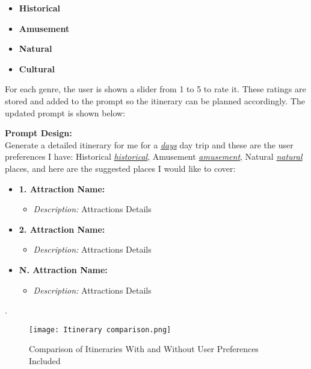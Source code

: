 \documentclass[sigconf,authordraft]{acmart}
\begin{document}
\begin{itemize}
  \item \textbf{Historical}
  \item \textbf{Amusement}
  \item \textbf{Natural}
  \item \textbf{Cultural}
\end{itemize}

For each genre, the user is shown a slider from 1 to 5 to rate it. These ratings are stored and added to the prompt so the itinerary can be planned accordingly. The updated prompt is shown below:

\begin{tcolorbox}[linewidth=1pt, innerleftmargin=15pt, innerrightmargin=15pt, innertopmargin=15pt, innerbottommargin=15pt]
  \textbf{Prompt Design:} \\

  Generate a detailed itinerary for me for a \underline{\textit{days}} day trip and these are the user preferences I have:
  Historical \underline{\textit{historical}}, Amusement \underline{\textit{amusement}}, Natural \underline{\textit{natural}} places, and here are the suggested places I would like to cover:

  \begin{itemize}
    \item \textbf{1. Attraction Name:}
    \begin{itemize}
        \item \textit{Description:} Attractions Details
    \end{itemize}
    \item \textbf{2. Attraction Name:}
    \begin{itemize}
        \item \textit{Description:} Attractions Details
    \end{itemize}
    \vspace{2\baselineskip} %
    \item \textbf{N. Attraction Name:}
    \begin{itemize}
        \item \textit{Description:} Attractions Details
    \end{itemize}
  \end{itemize}
\end{tcolorbox}

\newpage
.
\newpage

\begin{figure}[H]
    \centering
    \texttt{[image: Itinerary comparison.png]} %
    \caption{Comparison of Itineraries With and Without User Preferences Included}
    \label{fig:itinerary_comparison}
\end{figure}
\end{document}
